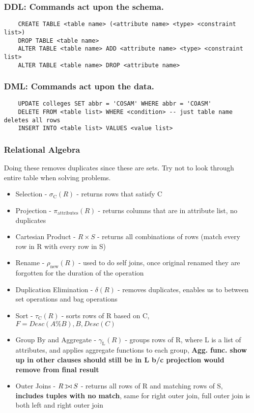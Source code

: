\documentclass[9pt]{extarticle}
\def\ojoin{\setbox0=\hbox{$\bowtie$}%
  \rule[-.02ex]{.25em}{.4pt}\llap{\rule[\ht0]{.25em}{.4pt}}}
\def\leftouterjoin{\mathbin{\ojoin\mkern-5.8mu\bowtie}}
\begin{document}
\subsubsection*{DDL: Commands act upon the schema.}
\begin{verbatim}
    CREATE TABLE <table name> (<attribute name> <type> <constraint list>)
    DROP TABLE <table name>
    ALTER TABLE <table name> ADD <attribute name> <type> <constraint list>
    ALTER TABLE <table name> DROP <attribute name>
\end{verbatim}

\subsubsection*{DML: Commands act upon the data.}
\begin{verbatim}
    UPDATE colleges SET abbr = 'COSAM' WHERE abbr = 'COASM'
    DELETE FROM <table list> WHERE <condition> -- just table name deletes all rows
    INSERT INTO <table list> VALUES <value list>
\end{verbatim}

\subsubsection*{Relational Algebra}
Doing these removes duplicates since these are sets. Try not to look through
entire table when solving problems.
\begin{itemize}
    \item Selection - $\sigma_{\text{C}}(R)$ - returns rows that satisfy C
    \item Projection - $\pi_{\text{attributes}}(R)$ - returns columns that are
    in attribute list, no duplicates
    \item Cartesian Product - $R \times S$ - returns all combinations of rows 
    (match every row in R with every row in S)
    \item Rename - $\rho_{\text{new}}(R)$ - used to do self joins, once original 
    renamed they are forgotten for the duration of the operation
    \item Duplication Elimination - $\delta(R)$ - removes duplicates, enables us
    to between set operations and bag operations
    \item Sort - $\tau_{\text{C}}(R)$ - sorts rows of R based on C, $F=Desc(A 
    \% B),B,Desc(C)$
    \item Group By and Aggregate - $\gamma_{\text{L}}(R)$ - groups rows of R, 
    where L is a list of attributes, and applies aggregate functions to each
    group, \textbf{Agg. func. show up in other clauses should still be in
    L b/c projection would remove from final result}
    \item Outer Joins - $R \leftouterjoin S$ - returns all rows of R and 
    matching rows of S, \textbf{includes tuples with no match}, same for 
    right outer join, full outer join is both left and right outer join
\end{itemize}
\end{document}
